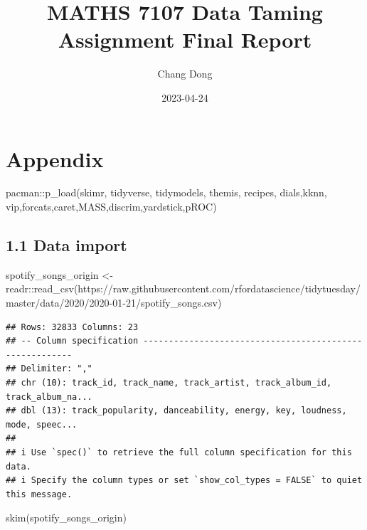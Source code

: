 \documentclass[
]{article}
\title{MATHS 7107 Data Taming Assignment Final Report}
\author{Chang Dong}
\date{2023-04-24}
\newenvironment{Shaded}{\begin{snugshade}}{\end{snugshade}}
\newcommand{\FunctionTok}[1]{\textcolor[rgb]{0.00,0.00,0.00}{#1}}
\newcommand{\NormalTok}[1]{#1}
\newcommand{\OtherTok}[1]{\textcolor[rgb]{0.56,0.35,0.01}{#1}}
\newcommand{\SpecialCharTok}[1]{\textcolor[rgb]{0.00,0.00,0.00}{#1}}
\newcommand{\StringTok}[1]{\textcolor[rgb]{0.31,0.60,0.02}{#1}}
\begin{document}
\maketitle

\hypertarget{appendix}{%
\section{Appendix}\label{appendix}}

\begin{Shaded}
\begin{Highlighting}[]
\NormalTok{pacman}\SpecialCharTok{::}\FunctionTok{p\_load}\NormalTok{(skimr, tidyverse, tidymodels, themis, recipes, dials,kknn, vip,forcats,caret,MASS,discrim,yardstick,pROC)}
\end{Highlighting}
\end{Shaded}

\hypertarget{data-import}{%
\subsection{1.1 Data import}\label{data-import}}

\begin{Shaded}
\begin{Highlighting}[]
\NormalTok{spotify\_songs\_origin }\OtherTok{\textless{}{-}}\NormalTok{ readr}\SpecialCharTok{::}\FunctionTok{read\_csv}\NormalTok{(}\StringTok{\textquotesingle{}https://raw.githubusercontent.com/rfordatascience/tidytuesday/master/data/2020/2020{-}01{-}21/spotify\_songs.csv\textquotesingle{}}\NormalTok{)}
\end{Highlighting}
\end{Shaded}

\begin{verbatim}
## Rows: 32833 Columns: 23
## -- Column specification --------------------------------------------------------
## Delimiter: ","
## chr (10): track_id, track_name, track_artist, track_album_id, track_album_na...
## dbl (13): track_popularity, danceability, energy, key, loudness, mode, speec...
## 
## i Use `spec()` to retrieve the full column specification for this data.
## i Specify the column types or set `show_col_types = FALSE` to quiet this message.
\end{verbatim}

\begin{Shaded}
\begin{Highlighting}[]
\FunctionTok{skim}\NormalTok{(spotify\_songs\_origin)}
\end{Highlighting}
\end{Shaded}
\end{document}
